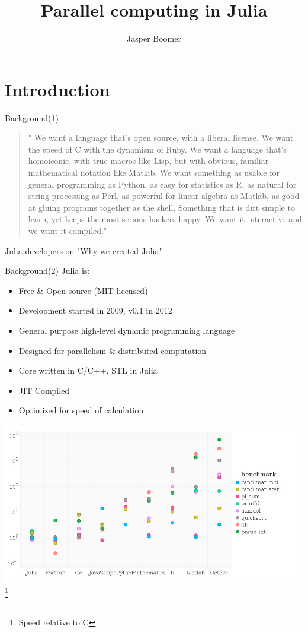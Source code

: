 \documentclass{beamer}
\title{Parallel computing in Julia}
\author{Jasper Boomer}
\begin{document}
	\frame{\titlepage}
	\section{Introduction}
	\begin{frame}{Background(1)}
		\begin{quote}
			" We want a language that’s open source, with a liberal license. We want the speed of C with the dynamism of Ruby. We want a language that’s homoiconic, with true macros like Lisp, but with obvious, familiar mathematical notation like Matlab. We want something as usable for general programming as Python, as easy for statistics as R, as natural for string processing as Perl, as powerful for linear algebra as Matlab, as good at gluing programs together as the shell. Something that is dirt simple to learn, yet keeps the most serious hackers happy. We want it interactive and we want it compiled."
		\end{quote}
		Julia developers on "Why we created Julia"
	\end{frame}


	\begin{frame}{Background(2)}
		Julia is: 
		\begin{itemize}
			\item{Free \& Open source (MIT licensed)}
			\item{Development started in 2009, v0.1 in 2012}
			\item{General purpose high-level dynamic programming language}
			\item{Designed for parallelism \& distributed computation}
			\item{Core written in C/C++, STL in Julia}
			\item{JIT Compiled}
			\item{Optimized for speed of calculation}
		\end{itemize}
	\end{frame}

	\begin{frame}
		\includegraphics[width=\textwidth]{figures/benchmarks.jpg}
		\footnote{Speed relative to C}
	\end{frame}
\end{document}
